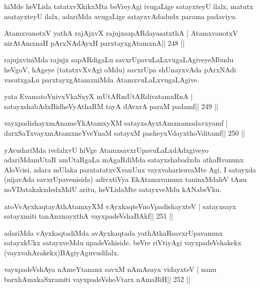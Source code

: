 \begin{artha}
hiMde heVLida tatatxvXkikxMta beVreyAgi ivugaLige satayxteyU ilalx, matutx asatayxteyU ilalx, adariMda avugaLige satayxvAdadudx parama padaviyu.
\end{artha}

\begin{shl}
AtamxvanotxV yathA rajAjxvX rajujxsapARdayasatxthA |
AtamxvanotxV nirAtAmxnaH pArxNAdAyxH parxtayxgAtamxnA\hfill || 248 ||
\end{shl}

\begin{artha}
rajujxviniMda rajujx sapARdigaLu savxrUpavuLaLxvugaLAgiveyeMbudu  heVgoV, hAgeye (tatatxvXvAgi oMdu) savxrUpa shUnayxvAda pArxNAdi vasutxgaLu parxtayxgAtamxniMda AtamxvuLaLxvugaLAgive.
\end{artha}

\begin{shl}
yata EvamatoV\s nivxVkaSxyX mUtARmUtARdivatamxRnA |
satayxshabAdxBidheVyAthaRM tayA dAvxrA paraM padamf\hfill || 249 ||
\end{shl}

\begin{shl}
vayxpadishayxmAnameYkAtamxyXM satayxsAyx\s\s tAmxnamadavxyamf |
darxSaTxvayxmAtamxneYveYnaM satayxM pasheyxVdayxthoVditamf\hfill || 250 ||
\end{shl}

\begin{artha}
yAvudariMda ivelalxvU hiVge AtamxsavxrUpavuLaLxdAdxgiveyo adariMda\break mUtaR amUtaRgaLa mAgaRdiMda satayxshabadxda athaRvanunx AloVcisi, adara mUlaka paratatatxvXvanUnx vayxvaharisuvaMte Agi, I satayxda (nijavAda savxrUpavenisida) adivxtiVya EkAtamxvanunx taninxMdaleV tAnu noVDatakakxdedxMdU aritu, heVLidaMte satayxveMdu kANabeVku.
\end{artha}

\begin{shl}
atoV\s vAyxkaqtayAthAtamxyXM vAyxkaqteVnoVpadishayxteV |
satayxsayx satayxmiti tanAnxnayxthA vayxpadeVshaBAkf\hfill || 251 ||
\end{shl}

\begin{artha}
adariMda vAyxkaqtadiMda avAyxkaqtada yathAthaRsavxrUpavanunx satayxkUkx satayxveMdu upadeVshiside. beVre riVtiyAgi vayxpadeVshakekx (vayxvahArakekx)\break BAgiyAguvudilalx.
\end{artha}

\begin{shl}
vayxpadeVshAya nAmeYtananx savxM nAmAsayx vidayxteV |
nanu barxhAmxkaSxramiti vayxpadeVshoV\s tarx nAmaBiH\hfill || 252 ||
\end{shl}

